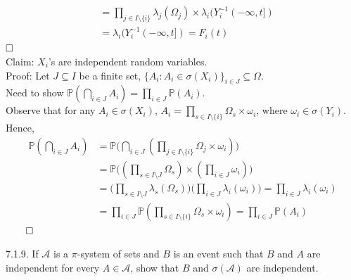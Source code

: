\begin{answer}
\begin{equation*}
\begin{aligned}
            \\&= \prod_{j \in I \setminus \{ i\}} \lambda_j(\Omega_j) \times \lambda_i(Y_{i}^{-1} ( -\infty, t ])
            \\&= \lambda_i(Y_{i}^{-1} ( -\infty, t ]) = F_i(t)
        \end{aligned}
    \end{equation*}
    $\hfill\Box$
    \\Claim: $X_i$'s are independent random variables.
    \\Proof: Let $J \subseteq I$ be a finite set, $\{ A_i : A_{i} \in \sigma(X_i)\}_{i \in J} \subseteq \Omega$. 
    \\Need to show $\mathbb{P}(\bigcap_{i \in J }A_{i} ) = \prod_{i \in J} \mathbb{P}(A_i)$.
    \\Observe that for any $A_i \in \sigma(X_i)$, $A_i = \prod_{s \in I \setminus \{ i\}} \Omega_s \times \omega_i$, where $\omega_i \in \sigma (Y_i)$.
    \\Hence, 
    \begin{equation*}
        \begin{aligned}
                    \mathbb{P}(\bigcap_{i \in J }A_{i}) &= \mathbb{P}\Big( \bigcap_{i \in J }(\prod_{j \in I \setminus \{ i\}} \Omega_j \times \omega_i)\Big)
                    \\&= \mathbb{P}\Big( (\prod_{s \in I \setminus J}\Omega_s) \times (\prod_{i \in J} \omega_i) \Big)
                    \\&= \Big(\prod_{s \in I \setminus J} \lambda_s(\Omega_s) \Big)\Big( \prod_{i \in J} \lambda_i(\omega_i)\Big) = \prod_{i \in J} \lambda_i(\omega_i)
                    \\&= \prod_{i \in J} \mathbb{P}(\prod_{s \in I \setminus \{ i\}}\Omega_s \times \omega_i) = \prod_{i \in J} \mathbb{P}(A_i)
        \end{aligned}
    \end{equation*}
    $\hfill\qed$ 
\end{answer}

\begin{exercise}7.1.9.
If $\mathcal{A}$ is a $\pi$-system of sets and $B$ is an event such that $B$ and $A$ are independent for every $A\in\mathcal{A}$, show that $B$ and $\sigma(\mathcal{A})$ are independent.
\end{exercise}

